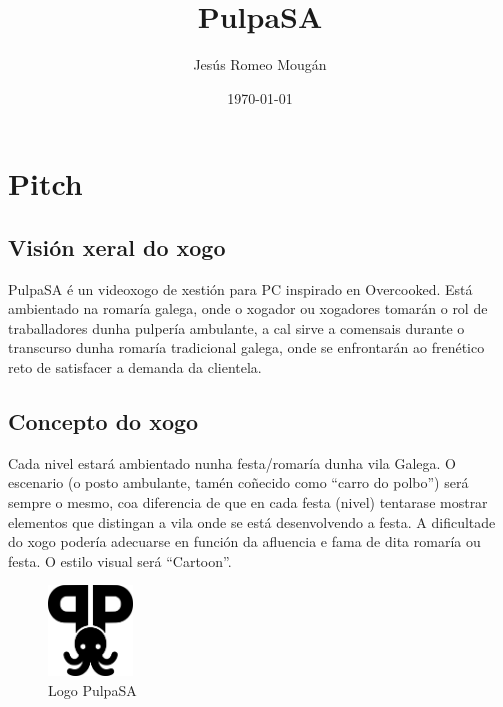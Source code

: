\documentclass{report}  %
\title{PulpaSA}  %
\author{Jesús Romeo Mougán}                     %
\date{\today}                           %
\begin{document}
\captionsetup{aboveskip=5pt, belowskip=10pt}



\renewcommand{\contentsname}{Índice}

\tableofcontents


\newpage

\section{Pitch}

\subsection{Visión xeral do xogo}
PulpaSA é un videoxogo de xestión para PC inspirado en Overcooked. Está 
ambientado na romaría galega, onde o xogador ou xogadores tomarán o rol de 
traballadores dunha pulpería ambulante, a cal sirve a comensais durante o 
transcurso dunha romaría tradicional galega, onde se enfrontarán ao frenético 
reto de satisfacer a demanda da clientela.

\subsection{Concepto do xogo}

Cada nivel estará ambientado nunha festa/romaría dunha vila Galega. O 
escenario (o posto ambulante, tamén coñecido como “carro do polbo”) será 
sempre o mesmo, coa diferencia de que en cada festa (nivel) tentarase 
mostrar elementos que distingan a vila onde se está desenvolvendo a festa. A 
dificultade do xogo podería adecuarse en función da afluencia e fama de dita 
romaría ou festa. O estilo visual será “Cartoon”.

\begin{figure}[h]
    \centering
    \includegraphics[width=0.2\textwidth]{images/pulpasa_logo.png}
    \caption{Logo PulpaSA}
    \label{fig:Boceto Logo PulpaSA}
\end{figure}
\end{document}
